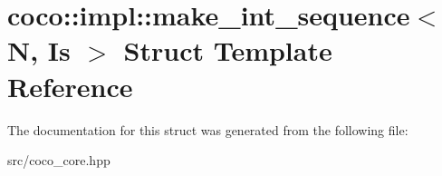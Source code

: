 \hypertarget{structcoco_1_1impl_1_1make__int__sequence}{}\section{coco\+:\+:impl\+:\+:make\+\_\+int\+\_\+sequence$<$ N, Is $>$ Struct Template Reference}
\label{structcoco_1_1impl_1_1make__int__sequence}


The documentation for this struct was generated from the following file\+:\begin{DoxyCompactItemize}
\item 
src/coco\+\_\+core.\+hpp\end{DoxyCompactItemize}
